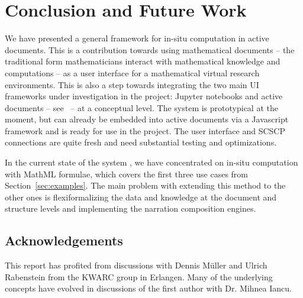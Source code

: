 \section{Conclusion and Future Work}\label{sec:concl}

We have presented a general framework for in-situ computation in active documents. This is
a contribution towards using mathematical documents -- the traditional form mathematicians
interact with mathematical knowledge and computations -- as a user interface for a
mathematical virtual research environments. This is also a step towards integrating the
two main UI frameworks under investigation in the \pn project: Jupyter notebooks and
active documents -- see~ -- at a conceptual level. The system is
prototypical at the moment, but can already be embedded into active documents via a
Javascript framework and is ready for use in the \pn project. The user interface and SCSCP
connections are quite fresh and need substantial testing and optimizations.

In the current state of the system , we have concentrated on in-situ computation with
MathML formulae, which covers the first three use cases from Section~\ref{sec:examples}.
The main problem with extending this method to the other ones is flexiformalizing
the data and knowledge at the document and structure levels and implementing the narration
composition engines. 

\subsection*{Acknowledgements}
This report has profited from discussions with Dennis M\"uller and Ulrich Rabenstein from
the KWARC group in Erlangen. Many of the underlying concepts have evolved in discussions of
the first author with Dr. Mihnea Iancu.


